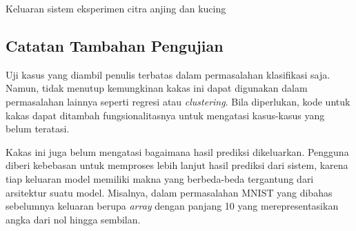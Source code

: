 \begin{code}
	\caption{Keluaran sistem eksperimen citra anjing dan kucing}\label{listing:28}
\end{code}

\subsection{Catatan Tambahan Pengujian}

Uji kasus yang diambil penulis terbatas dalam permasalahan klasifikasi saja.
Namun, tidak menutup kemungkinan kakas ini dapat digunakan dalam permasalahan lainnya seperti regresi atau \textit{clustering}.
Bila diperlukan, kode untuk kakas dapat ditambah fungsionalitasnya untuk mengatasi kasus-kasus yang belum teratasi.

Kakas ini juga belum mengatasi bagaimana hasil prediksi dikeluarkan.
Pengguna diberi kebebasan untuk memproses lebih lanjut hasil prediksi dari sistem, karena tiap keluaran model memiliki makna yang berbeda-beda tergantung dari arsitektur suatu model.
Misalnya, dalam permasalahan MNIST yang dibahas sebelumnya keluaran berupa \textit{array} dengan panjang 10 yang merepresentasikan angka dari nol hingga sembilan.